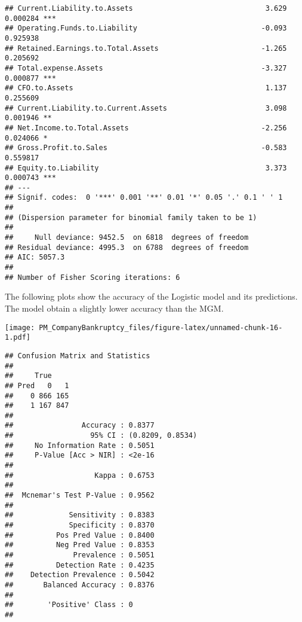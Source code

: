 \documentclass[
]{article}
\begin{document}
\begin{verbatim}
## Current.Liability.to.Assets                               3.629 0.000284 ***
## Operating.Funds.to.Liability                             -0.093 0.925938    
## Retained.Earnings.to.Total.Assets                        -1.265 0.205692    
## Total.expense.Assets                                     -3.327 0.000877 ***
## CFO.to.Assets                                             1.137 0.255609    
## Current.Liability.to.Current.Assets                       3.098 0.001946 ** 
## Net.Income.to.Total.Assets                               -2.256 0.024066 *  
## Gross.Profit.to.Sales                                    -0.583 0.559817    
## Equity.to.Liability                                       3.373 0.000743 ***
## ---
## Signif. codes:  0 '***' 0.001 '**' 0.01 '*' 0.05 '.' 0.1 ' ' 1
## 
## (Dispersion parameter for binomial family taken to be 1)
## 
##     Null deviance: 9452.5  on 6818  degrees of freedom
## Residual deviance: 4995.3  on 6788  degrees of freedom
## AIC: 5057.3
## 
## Number of Fisher Scoring iterations: 6
\end{verbatim}

The following plots show the accuracy of the Logistic model and its
predictions. The model obtain a slightly lower accuracy than the MGM.

\texttt{[image: PM\_CompanyBankruptcy\_files/figure-latex/unnamed-chunk-16-1.pdf]}

\begin{verbatim}
## Confusion Matrix and Statistics
## 
##     True
## Pred   0   1
##    0 866 165
##    1 167 847
##                                           
##                Accuracy : 0.8377          
##                  95% CI : (0.8209, 0.8534)
##     No Information Rate : 0.5051          
##     P-Value [Acc > NIR] : <2e-16          
##                                           
##                   Kappa : 0.6753          
##                                           
##  Mcnemar's Test P-Value : 0.9562          
##                                           
##             Sensitivity : 0.8383          
##             Specificity : 0.8370          
##          Pos Pred Value : 0.8400          
##          Neg Pred Value : 0.8353          
##              Prevalence : 0.5051          
##          Detection Rate : 0.4235          
##    Detection Prevalence : 0.5042          
##       Balanced Accuracy : 0.8376          
##                                           
##        'Positive' Class : 0               
## 
\end{verbatim}
\end{document}
